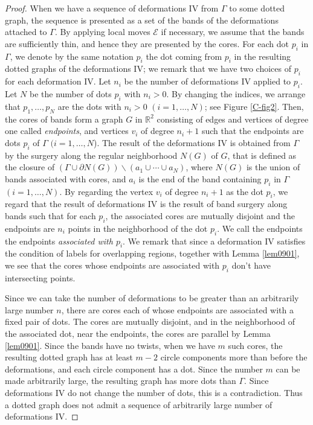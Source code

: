 \documentclass[a4paper,11pt]{amsart}
\numberwithin{equation}{section}
\begin{document}
\begin{proof}
When we have a sequence of deformations IV from $\Gamma$ to some dotted graph, the sequence is presented as a set of the bands of the deformations attached to $\Gamma$. 
By applying local moves $\mathcal{E}$ if necessary, 
we assume that the bands are sufficiently thin, and hence they are presented by the cores. 
 For each dot $p_i$ in $\Gamma$, we denote by the same notation $p_i$ the dot coming from $p_i$ in the resulting dotted graphs of the deformations IV; we remark that we have two choices of $p_i$ for each deformation IV. 
Let $n_i$ be the number of deformations IV applied to $p_i$. Let $N$ be the number of dots $p_i$ with $n_i>0$. By changing the indices, we arrange that $p_1, \ldots, p_N$ are the dots with $n_i>0$ $(i=1, \ldots, N)$; see Figure \ref{C-fig2}. 
 Then, the cores of bands form a graph $G$ in $\mathbb{R}^2$ consisting of edges and vertices of degree one called {\it endpoints}, and vertices $v_i$ of degree $n_i+1$  such that the endpoints are dots $p_i$ of $\Gamma$ $(i=1, \ldots, N$). 
The result of the deformations IV is obtained from $\Gamma$ by the surgery along the regular neighborhood $N(G)$ of $G$, that is defined as the closure of $(\Gamma \cup \partial N(G))\backslash (a_1 \cup \cdots \cup a_N)$, where $N(G)$ is the union of bands associated with cores, and $a_i$ is the end of the band containing $p_i$ in $\Gamma$ $(i=1, \ldots, N)$. 
By regarding the vertex $v_i$ of degree $n_i+1$ as the dot $p_i$, we regard that the result of deformations IV is the result of band surgery along bands such that for each $p_i$, the associated cores are mutually disjoint and the endpoints are $n_i$ points in the neighborhood of the dot $p_i$. We call the endpoints the endpoints {\it associated with $p_i$}. We remark that since a deformation IV satisfies the condition of labels for overlapping regions, together with Lemma \ref{lem0901}, we see that the cores whose endpoints are associated with $p_i$ don't have intersecting points. 

Since we can take the number of deformations to be greater than an arbitrarily large number $n$, 
there are 
cores each of whose endpoints are associated with a fixed pair of dots. The cores are mutually disjoint, and in the neighborhood of the associated dot, near the endpoints, the cores are parallel by Lemma \ref{lem0901}. 
Since the bands have no twists, when we have $m$ such cores, the resulting dotted graph has at least $m-2$ circle components more than before the deformations, and each circle component has a dot. 
Since the number $m$ can be made arbitrarily large, the resulting graph has more dots than $\Gamma$. Since deformations IV do not change the number of dots, this is a contradiction. 
Thus a dotted graph does not admit a sequence of arbitrarily large number of deformations IV. 
\end{proof}
\end{document}
